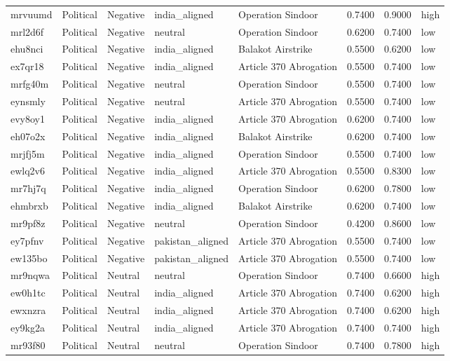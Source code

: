 \begin{longtable}{lllllrrl}
mrvuumd & Political & Negative & india\_aligned & Operation Sindoor & 0.7400 & 0.9000 & high \\
mrl2d6f & Political & Negative & neutral & Operation Sindoor & 0.6200 & 0.7400 & low \\
ehu8nci & Political & Negative & india\_aligned & Balakot Airstrike & 0.5500 & 0.6200 & low \\
ex7qr18 & Political & Negative & india\_aligned & Article 370 Abrogation & 0.5500 & 0.7400 & low \\
mrfg40m & Political & Negative & neutral & Operation Sindoor & 0.5500 & 0.7400 & low \\
eynsmly & Political & Negative & neutral & Article 370 Abrogation & 0.5500 & 0.7400 & low \\
evy8oy1 & Political & Negative & india\_aligned & Article 370 Abrogation & 0.6200 & 0.7400 & low \\
eh07o2x & Political & Negative & india\_aligned & Balakot Airstrike & 0.6200 & 0.7400 & low \\
mrjfj5m & Political & Negative & india\_aligned & Operation Sindoor & 0.5500 & 0.7400 & low \\
ewlq2v6 & Political & Negative & india\_aligned & Article 370 Abrogation & 0.5500 & 0.8300 & low \\
mr7hj7q & Political & Negative & india\_aligned & Operation Sindoor & 0.6200 & 0.7800 & low \\
ehmbrxb & Political & Negative & india\_aligned & Balakot Airstrike & 0.6200 & 0.7400 & low \\
mr9pf8z & Political & Negative & neutral & Operation Sindoor & 0.4200 & 0.8600 & low \\
ey7pfnv & Political & Negative & pakistan\_aligned & Article 370 Abrogation & 0.5500 & 0.7400 & low \\
ew135bo & Political & Negative & pakistan\_aligned & Article 370 Abrogation & 0.5500 & 0.7400 & low \\
mr9nqwa & Political & Neutral & neutral & Operation Sindoor & 0.7400 & 0.6600 & high \\
ew0h1tc & Political & Neutral & india\_aligned & Article 370 Abrogation & 0.7400 & 0.6200 & high \\
ewxnzra & Political & Neutral & india\_aligned & Article 370 Abrogation & 0.7400 & 0.6200 & high \\
ey9kg2a & Political & Neutral & india\_aligned & Article 370 Abrogation & 0.7400 & 0.7400 & high \\
mr93f80 & Political & Neutral & neutral & Operation Sindoor & 0.7400 & 0.7800 & high \\

\end{longtable}
